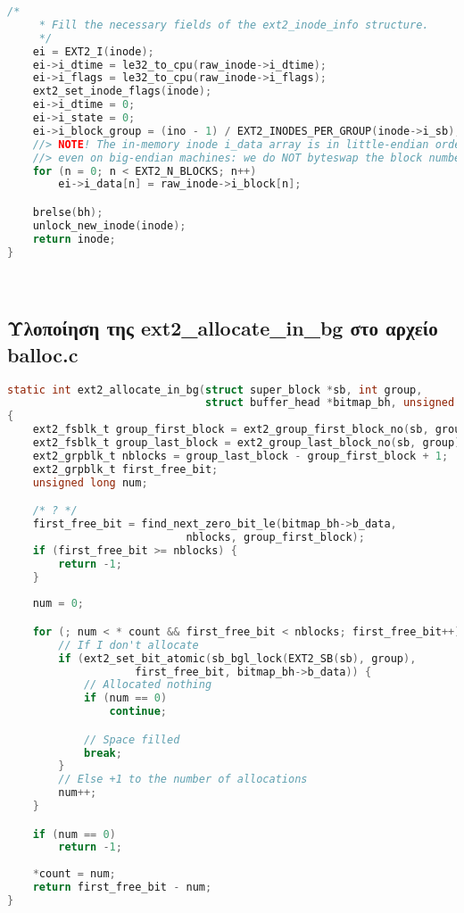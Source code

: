 \documentclass{article}
\begin{document}
\begin{enumerate}
\begin{lstlisting}[language=C]
	/*
	 * Fill the necessary fields of the ext2_inode_info structure.
	 */
	ei = EXT2_I(inode);
	ei->i_dtime = le32_to_cpu(raw_inode->i_dtime);
	ei->i_flags = le32_to_cpu(raw_inode->i_flags);
	ext2_set_inode_flags(inode);
	ei->i_dtime = 0;
	ei->i_state = 0;
	ei->i_block_group = (ino - 1) / EXT2_INODES_PER_GROUP(inode->i_sb);
	//> NOTE! The in-memory inode i_data array is in little-endian order
	//> even on big-endian machines: we do NOT byteswap the block numbers!
	for (n = 0; n < EXT2_N_BLOCKS; n++)
		ei->i_data[n] = raw_inode->i_block[n];

	brelse(bh);
	unlock_new_inode(inode);
	return inode;
}
\end{lstlisting} \\

\subsection{Υλοποίηση της ext2\_allocate\_in\_bg στο αρχείο balloc.c}
\begin{lstlisting}[language=C]
static int ext2_allocate_in_bg(struct super_block *sb, int group,
                               struct buffer_head *bitmap_bh, unsigned long *count)
{
	ext2_fsblk_t group_first_block = ext2_group_first_block_no(sb, group);
	ext2_fsblk_t group_last_block = ext2_group_last_block_no(sb, group);
	ext2_grpblk_t nblocks = group_last_block - group_first_block + 1;
	ext2_grpblk_t first_free_bit;
	unsigned long num;

	/* ? */
    first_free_bit = find_next_zero_bit_le(bitmap_bh->b_data,
                            nblocks, group_first_block);
    if (first_free_bit >= nblocks) {
        return -1;
    }
    
    num = 0;

    for (; num < * count && first_free_bit < nblocks; first_free_bit++) { 
        // If I don't allocate 
        if (ext2_set_bit_atomic(sb_bgl_lock(EXT2_SB(sb), group),
                    first_free_bit, bitmap_bh->b_data)) {
            // Allocated nothing
            if (num == 0)
                continue;

            // Space filled
            break;
        }
        // Else +1 to the number of allocations
        num++;
    }

    if (num == 0)
        return -1;
    
    *count = num;
    return first_free_bit - num;
}
\end{lstlisting} \\
\pagebreak


\end{enumerate}
\end{document}
